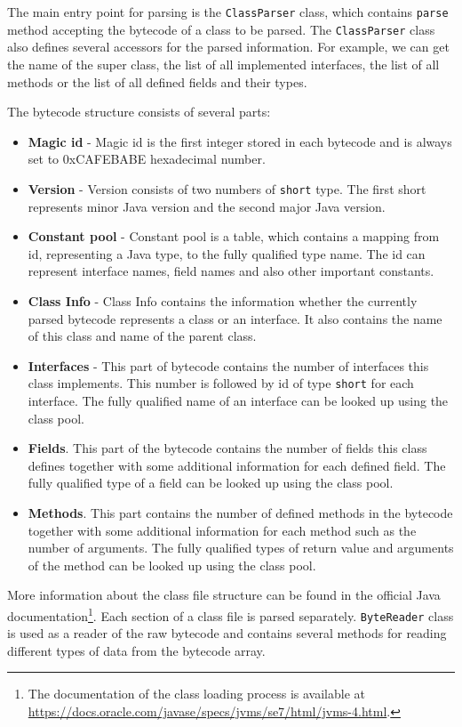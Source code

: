 The main entry point for parsing is the \texttt{ClassParser} class, which contains \texttt{parse} method accepting the bytecode of a class to be parsed. The \texttt{ClassParser} class also defines several accessors for the parsed information. For example, we can get the name of the super class, the list of all implemented interfaces, the list of all methods or the list of all defined fields and their types.

The bytecode structure consists of several parts:
\begin{itemize}
	\item \textbf{Magic id} - Magic id is the first integer stored in each bytecode and is always set to 0xCAFEBABE hexadecimal number.
	\item \textbf{Version} - Version consists of two numbers of \texttt{short} type. The first short represents minor Java version and the second major Java version.
	\item \textbf{Constant pool} - Constant pool is a table, which contains a mapping from id, representing a Java type, to the fully qualified type name. The id can represent interface names, field names and also other important constants.
	\item \textbf{Class Info} - Class Info contains the information whether the currently parsed bytecode represents a class or an interface. It also contains the name of this class and name of the parent class.
	\item \textbf{Interfaces} - This part of bytecode contains the number of interfaces this class implements. This number is followed by id of type \texttt{short} for each interface. The fully qualified name of an interface can be looked up using the class pool.
	\item \textbf{Fields}. This part of the bytecode contains the number of fields this class defines together with some additional information for each defined field. The fully qualified type of a field can be looked up using the class pool.
	\item \textbf{Methods}. This part contains the number of defined methods in the bytecode together with some additional information for each method such as the number of arguments. The fully qualified types of return value and arguments of the method can be looked up using the class pool.
\end{itemize}
More information about the class file structure can be found in the official Java documentation\footnote{The documentation of the class loading process is available at \url{https://docs.oracle.com/javase/specs/jvms/se7/html/jvms-4.html}.}.
Each section of a class file is parsed separately. \texttt{ByteReader} class is used as a reader of the raw bytecode and contains several methods for reading different types of data from the bytecode array. 

